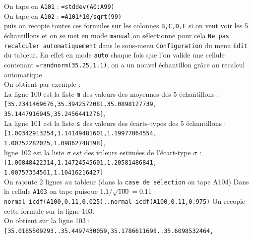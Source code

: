 \documentclass[a4paper,11pt]{book}
\begin{document}
On tape en {\tt A101} : {\tt =stddev(A0:A99)}\\
On tape en {\tt A102} : {\tt =A101*10/sqrt(99)}\\
puis on recopie toutes ces formules sur les colonnes {\tt B,C,D,E} si on veut 
voir les 5 \'echantillons et on se met en mode {\tt manual},on s\'electionne
pour cela {\tt Ne pas recalculer automatiquement} dans le sous-menu 
{\tt Configuration} du menu {\tt Edit} du tableur. En effet en mode {\tt auto}
chaque fois que l'on valide une cellule contenant {\tt =randnorm(35.25,1.1)},
on a un nouvel \'echantillon gr\^ace au recalcul automatique.\\ 
On obtient par exemple :\\
La ligne 100 est la liste {\tt m} des valeurs des moyennes des 5 
\'echantillons :\\
{\tt [35.2341469676,35.3942572081,35.0898127739,}\\
{\tt 35.1447916945,35.2456441276]},\\
La ligne 101 est la liste {\tt s} des valeurs des \'ecarts-types des 5 \'echantillons :\\
{\tt [1.00342913254,1.14149481601,1.19977064554,}\\
{\tt 1.00252282025,1.09862748198]},\\
ligne 102 est la liste $\sigma\_est$ des valeurs estim\'ees de l'\'ecart-type 
$\sigma$ :\\
{\tt [1.00848422314,1.14724545601,1.20581486841,}\\
{\tt 1.00757334501,1.10416216427]}\\
On rajoute 2 lignes au tableur (dans la {\tt case de s\'election} on tape A104)
Dans la cellule {\tt A103} on tape puisque $1.1/\sqrt{100}=0.11$ :\\
{\tt normal\_icdf(A100,0.11,0.025)..normal\_icdf(A100,0.11,0.975)}
On recopie cette formule sur la ligne 103.\\
On obtient sur la ligne 103 :\\
{\tt [35.0185509293..35.4497430059,35.1786611698..35.6098532464,}\\
\end{document}
